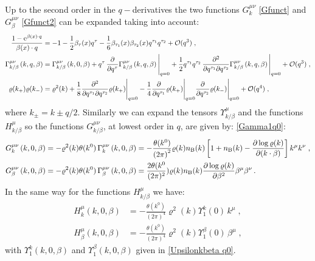 \documentclass[prd,superscriptaddress,nofootinbib,notitlepage]{revtex4-1}
\newcommand{\e}{{\rm e}}
\begin{document}
Up to the second order in the $q-$derivatives the two functions $G^{\mu\nu}_{k}$ \eqref{Gfunct} and $G^{\mu\nu}_\beta$ 
\eqref{Gfunct2} can be expanded taking into account:
%
\begin{equation*}
    \begin{split}
        \frac{1-\e^{\beta(x)\cdot q}}{\beta(x)\cdot q}&=-1-\frac{1}{2}\beta_\tau (x)q^\tau-\frac{1}{6}\beta_{\tau_1}(x)
        \beta_{\tau_2}(x)q^{\tau_1}q^{\tau_2}+\mathcal{O}(q^3)\;,\\
        \Gamma^{\mu\nu}_{k/\beta}\left(k,q,\beta\right)&=\Gamma^{\mu\nu}_{k/\beta}\left(k,0,\beta\right)+q^\tau\,
        \frac{\partial}{\partial q^\tau}\Gamma^{\mu\nu}_{k/\beta}\left(k,q,\beta\right)\Bigg|_{q=0}+\frac{1}{2}q^{\tau_1}q^{\tau_2}\,
        \frac{\partial^2}{\partial q^{\tau_1}\partial q^{\tau_2}}\Gamma^{\mu\nu}_{k/\beta}\left(k,q,\beta\right)\Bigg|_{q=0}+\mathcal{O}(q^3)\;,\\
        \varrho(k_+)\varrho(k_-)&=\varrho^2(k)+\frac{1}{8}
        \frac{\partial^2}{\partial q^{\tau_1}\partial q^{\tau_2}}\varrho(k_+)\Bigg|_{q=0}-\frac{1}{4}
        \frac{\partial}{\partial q^{\tau_1}}\varrho(k_+)\Bigg|_{q=0}
        \frac{\partial}{\partial q^{\tau_2}}\varrho(k_-)\Bigg|_{q=0}+\mathcal{O}(q^4)\;,
    \end{split}
\end{equation*}
%
where $k_\pm=k\pm q/2$.
Similarly we can expand the tensors $\Upsilon^\mu_{k/\beta}$ and the functions $H^\mu_{k/\beta}$ so the functions $G^{\mu\nu}_{k/\beta}$, at lowest  order in $q$, are given by:
\eqref{Gamma1q0}:
%
\begin{equation*}
    \begin{split}
        G^{\mu\nu}_k\left(k,0,\beta\right)&=-\varrho^2(k)\theta(k^0)\,\Gamma^{\mu\nu}_k\left(k,0,\beta\right)=-\frac{\theta(k^0)}{\left(2\pi\right)^2}\varrho(k)n_{\rm B}(k) \left[ 1+n_{\rm B}(k) 
    - \frac{\partial \log \varrho(k)}{\partial (k \cdot \beta)} \right]k^\mu k^\nu\;,\\
    G^{\mu\nu}_\beta\left(k,0,\beta\right)&=-\varrho^2(k)\theta(k^0)\,\Gamma^{\mu\nu}_\beta\left(k,0,\beta\right)=\frac{2\theta(k^0}{(2\pi)^2} )\varrho(k)n_{\rm B}(k)
  \frac{\partial \log \varrho(k)}{\partial \beta^2}\beta^\mu\beta^\nu\, .
    \end{split}
\end{equation*}
%
In the same way for the functions $H^\mu_{k/\beta}$ we have:
%
\begin{equation*}
    \begin{split}
        H^\mu_k\left(k,0,\beta\right)&=-\frac{\theta(k^0)}{(2\pi)^4}\varrho^2(k)\Upsilon^k_1(0)\,k^\mu\;,\\
        H^\mu_\beta\left(k,0,\beta\right)&=-\frac{\theta(k^0)}{(2\pi)^4}\varrho^2(k)\Upsilon^\beta_1(0)\,\beta^\mu\;,
    \end{split}
\end{equation*}
%
with $\Upsilon^k_1\left(k,0,\beta\right)$ and $\Upsilon^\beta_1\left(k,0,\beta\right)$ given in \eqref{Upsilonkbeta q0}.
\end{document}
